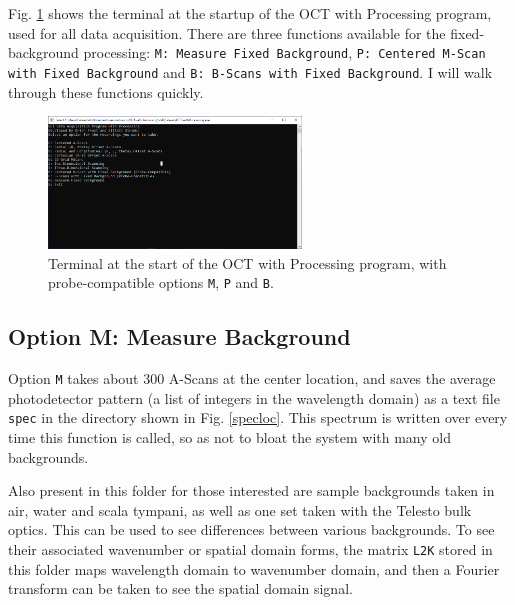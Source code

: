 \documentclass{article}
\begin{document}
\par{Fig. \ref{termstart} shows the terminal at the startup of the OCT with Processing program, used for all data acquisition. There are three functions available for the fixed-background processing: \texttt{M: Measure Fixed Background}, \texttt{P: Centered M-Scan with Fixed Background} and \texttt{B: B-Scans with Fixed Background}. I will walk through these functions quickly.}

\begin{figure}[!h]
	\centering
	\includegraphics[width=0.6\textwidth]{Data for Probe Writeup/Terminal at Startup.png}
	\caption{Terminal at the start of the OCT with Processing program, with probe-compatible options \texttt{M}, \texttt{P} and \texttt{B}.}\label{termstart}
\end{figure}

\subsection{Option M: Measure Background}

\par{Option \texttt{M} takes about 300 A-Scans at the center location, and saves the average photodetector pattern (a list of integers in the wavelength domain) as a text file \texttt{spec} in the directory shown in Fig. \ref{specloc}. This spectrum is written over every time this function is called, so as not to bloat the system with many old backgrounds.}

\par{Also present in this folder for those interested are sample backgrounds taken in air, water and scala tympani, as well as one set taken with the Telesto bulk optics. This can be used to see differences between various backgrounds. To see their associated wavenumber or spatial domain forms, the matrix \texttt{L2K} stored in this folder maps wavelength domain to wavenumber domain, and then a Fourier transform can be taken to see the spatial domain signal.}
\end{document}
